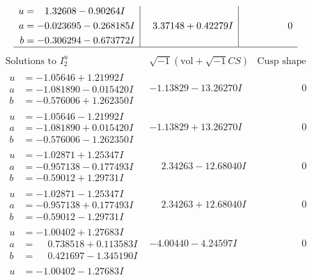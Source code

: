 \documentclass[1p]{elsarticle_modified}
\theoremstyle{definition}
\newcommand{\I}{\sqrt{-1}}
\begin{document}
$$\begin{array}{c|c|c}
\begin{aligned}
u &= \phantom{-}1.32608 - 0.90264 I \\
a &= -0.023695 - 0.268185 I \\
b &= -0.306294 - 0.673772 I\end{aligned}
 & \phantom{-}3.37148 + 0.42279 I & \phantom{-0.000000 } 0\\
 \hline 
 \end{array}$$\newpage$$\begin{array}{c|c|c}  
\text{Solutions to }I^u_{2}& \I (\text{vol} + \sqrt{-1}CS) & \text{Cusp shape}\\
 \hline 
\begin{aligned}
u &= -1.05646 + 1.21992 I \\
a &= -1.081890 - 0.015420 I \\
b &= -0.576006 + 1.262350 I\end{aligned}
 & -1.13829 - 13.26270 I & \phantom{-0.000000 } 0 \\ \hline\begin{aligned}
u &= -1.05646 - 1.21992 I \\
a &= -1.081890 + 0.015420 I \\
b &= -0.576006 - 1.262350 I\end{aligned}
 & -1.13829 + 13.26270 I & \phantom{-0.000000 } 0 \\ \hline\begin{aligned}
u &= -1.02871 + 1.25347 I \\
a &= -0.957138 - 0.177493 I \\
b &= -0.59012 + 1.29731 I\end{aligned}
 & \phantom{-}2.34263 - 12.68040 I & \phantom{-0.000000 } 0 \\ \hline\begin{aligned}
u &= -1.02871 - 1.25347 I \\
a &= -0.957138 + 0.177493 I \\
b &= -0.59012 - 1.29731 I\end{aligned}
 & \phantom{-}2.34263 + 12.68040 I & \phantom{-0.000000 } 0 \\ \hline\begin{aligned}
u &= -1.00402 + 1.27683 I \\
a &= \phantom{-}0.738518 + 0.113583 I \\
b &= \phantom{-}0.421697 - 1.345190 I\end{aligned}
 & -4.00440 - 4.24597 I & \phantom{-0.000000 } 0 \\ \hline\begin{aligned}
u &= -1.00402 - 1.27683 I \\

\end{aligned}
\end{array}$$
\end{document}
